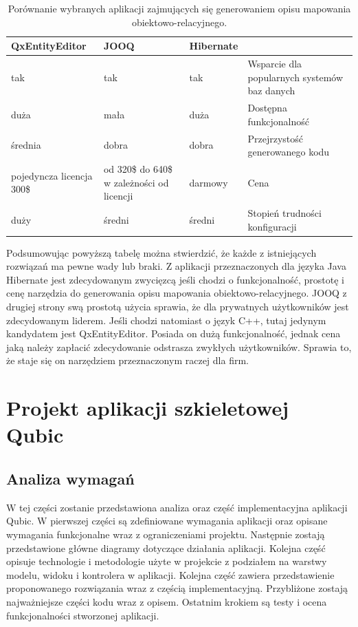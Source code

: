 \documentclass[12pt]{report}
\begin{document}
\begin{table}[!ht]
\centering
    \begin{tabular}{| p{3cm} |  p{3cm} |  p{2cm} | p{3cm} |}
    \hline
    QxEntityEditor & JOOQ & Hibernate & \\ \hline
     tak & tak & tak & Wsparcie dla popularnych systemów baz danych \\ \hline
 duża & mała & duża & Dostępna funkcjonalność \\ \hline
 średnia & dobra & dobra & Przejrzystość generowanego kodu \\ \hline
 pojedyncza licencja 300\$ & od 320\$ do 640\$ w zależności od licencji & darmowy & Cena \\ \hline
 duży & średni & średni & Stopień trudności konfiguracji \\ \hline
    \end{tabular}
    \caption{Porównanie wybranych aplikacji zajmujących się generowaniem opisu mapowania obiektowo-relacyjnego.}
\end{table}

Podsumowując powyższą tabelę można stwierdzić, że każde z istniejących roz\-wiązań ma pewne wady lub braki. Z aplikacji przeznaczonych dla języka Java Hibernate jest zdecydowanym zwycięzcą jeśli chodzi o funkcjonalność, prostotę i cenę narzędzia do generowania opisu mapowania obiektowo-relacyjnego. JOOQ z drugiej strony swą prostotą użycia sprawia, że dla prywatnych użytkowników jest zdecydowanym liderem. Jeśli chodzi natomiast o język C++, tutaj jedynym kandydatem jest QxEntityEditor. Posiada on dużą funkcjonalność, jednak cena jaką należy zapłacić zdecydowanie odstrasza zwykłych użytkowników. Sprawia to, że staje się on narzędziem przeznaczonym raczej dla firm.

\chapter{Projekt aplikacji szkieletowej Qubic} \label{rozdz.czesc.prakt}

\section{Analiza wymagań}
	\indent W tej części zostanie przedstawiona analiza oraz część implementacyjna aplikacji Qubic. W pierwszej części są zdefiniowane wymagania aplikacji oraz opisane wymagania funkcjonalne wraz z ograniczeniami projektu. Następnie zostają przedstawione główne diagramy dotyczące działania aplikacji. Kolejna część opisuje technologie i metodologie użyte w projekcie z podziałem na warstwy modelu, widoku i kontrolera w aplikacji. Kolejna część zawiera przedstawienie proponowanego rozwiązania wraz z częścią implementacyjną. Przybliżone zostają najważniejsze części kodu wraz z opisem. Ostatnim krokiem są testy i ocena funkcjonalności stworzonej aplikacji.
\end{document}
